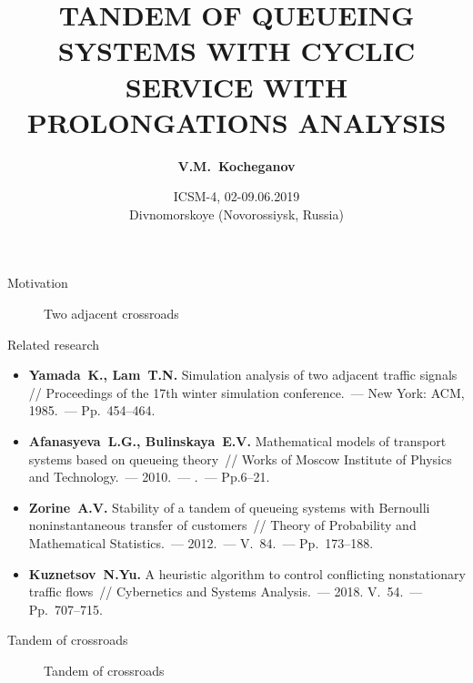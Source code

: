 \documentclass[10pt]{beamer}
\newcommand{\No}{\textnumero}
\begin{document}
\title[ \MakeUppercase{Tandem of queueing }...]{\normalsize \color{blue} \MakeUppercase{ Tandem of queueing systems with cyclic service with prolongations analysis}}

\author[V.M.~Kocheganov (NNSU)]{\textbf{V.M.~Kocheganov}}
\date[02-09.06.2019]{
ICSM-4, 02-09.06.2019\\ 
  Divnomorskoye (Novorossiysk, Russia)
}

\begin{frame}
\titlepage
\end{frame}

\begin{frame}{Motivation}
      \begin{figure}[h]
    \centering
    \caption{Two adjacent crossroads}
    \label{VK:fig:1}
  \end{figure}
\end{frame}

\begin{frame}{Related research}
    \begin{itemize}
    \item \textbf{Yamada~K., Lam~T.N.} Simulation analysis of two adjacent traffic signals // Proceedings of the 17th winter simulation conference.~--- New York: ACM, 1985.~--- Pp.~454--464.
    \item \textbf{Afanasyeva~L.G., Bulinskaya~E.V. } Mathematical models of transport systems based on queueing theory~// Works of Moscow Institute of Physics and Technology.~--- 2010.~--- \No{4}.~--- Pp.6--21. 
\item \textbf{Zorine~A.V.} Stability of a tandem of queueing systems with Bernoulli noninstantaneous transfer of  customers~// Theory of Probability and Mathematical Statistics.~--- 2012.~--- V.~84.~--- Pp.~173--188.
\item \textbf{Kuznetsov~N.Yu.} A heuristic algorithm to control conflicting nonstationary traffic flows~// Cybernetics and Systems Analysis.~--- 2018. V.~54.~--- Pp.~707--715.
    \end{itemize}
\end{frame}


\begin{frame}{Tandem of crossroads }
  \begin{figure}[h]
    \centering
    \caption{Tandem of crossroads }
    \label{VK:fig:1}
  \end{figure}
\end{frame} 
\end{document}
